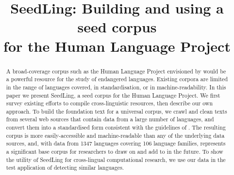 \documentclass[11pt]{article}
\title{SeedLing: Building and using a seed corpus \\ for the Human Language Project}
\date{}
\newcommand{\bluenote}[1]{\textcolor{blue}{[#1]}}
\begin{document}
\maketitle
\begin{abstract}
  A broad-coverage corpus such as the Human Language Project
  envisioned by  would be a powerful
  resource for the study of endangered languages.
  Existing corpora are limited in the range of languages covered, in
  standardisation, or in machine-readability. In this paper we present
  SeedLing, a seed corpus for the Human Language Project. We first
  survey existing efforts to compile cross-linguistic resources, then
  describe our own approach. To build the foundation text for a
  universal corpus, we crawl and clean texts from several web sources
  that contain data from a large number of languages, and convert them
  into a standardised form consistent with the guidelines of
  . The resulting corpus is more
  easily-accessible and machine-readable than any of the underlying
  data sources, and, with data from 1347 languages covering 106
  language families, represents a significant base corpus for
  researchers to draw on and add to in the future. To show the utility
  of SeedLing for cross-lingual computational research, we use our
  data in the test application of detecting similar languages.
\end{abstract}




%



%



\end{document}
